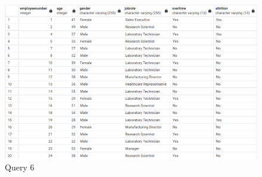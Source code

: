 \documentclass[12pt]{article}
\begin{document}
\begin{figure}[H]
    \centering
    \includegraphics[width=1\textwidth]{images/query6.png}
    \caption{Query 6}
    \label{fig:query6}
\end{figure}
\end{document}
